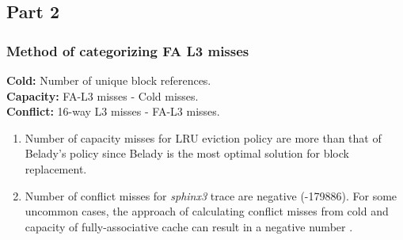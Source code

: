 \subsection{Part 2}
\subsubsection{Method of categorizing FA L3 misses}
\textbf{Cold:} Number of unique block references.\\
\textbf{Capacity:} FA-L3 misses - Cold misses.\\
\textbf{Conflict:} 16-way L3 misses - FA-L3 misses.

\begin{enumerate}
	\item Number of capacity misses for LRU eviction policy are more than that of Belady's policy since Belady is the most optimal solution for block replacement.
	\item Number of conflict misses for \textit{sphinx3} trace are negative (-179886). For some uncommon cases, the approach of calculating conflict misses from cold and capacity of fully-associative cache can result in a negative number \cite{solihin2015fundamentals}.
\end{enumerate}